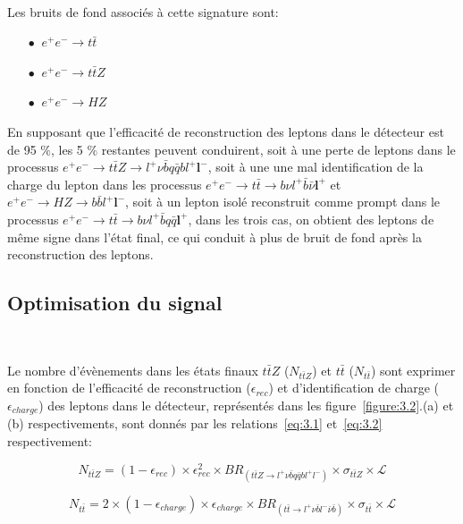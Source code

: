~\par Les bruits de fond associés \`a cette signature sont:
\begin{itemize}
\item[$\bullet$] $\ e^+e^-{\rightarrow}t\bar{t}$
\item[$\bullet$] $\ e^+e^-{\rightarrow}t\bar{t}Z$
\item[$\bullet$] $\ e^+e^-{\rightarrow}HZ$   
\end{itemize}
En supposant que l'efficacit\'e de reconstruction des leptons dans le d\'etecteur est de 95 $\%$, les 5 $\%$ restantes peuvent conduirent, soit \`a une perte de leptons dans le processus $e^+e^-{\rightarrow}t\bar{t}Z{\rightarrow}l^+\nu \bar{b}q\bar{q}bl^{+} \mathbf{l^-}$, soit \`a une une mal identification de la charge du lepton dans les processus $e^+e^-{\rightarrow}t\bar{t}{\rightarrow}b\nu l^+ \bar{b}\bar{\nu} \mathbf{l^+}$ et $e^+e^-{\rightarrow}HZ{\rightarrow}b\bar{b}l^+ \mathbf{l^-}$, soit à un lepton isolé reconstruit comme prompt dans le processus $e^+e^-{\rightarrow}t\bar{t}{\rightarrow}b\nu l^+\bar{b}q\bar{q} \mathbf{l^+}$, dans les trois cas, on obtient des leptons de m\^eme signe dans l'\'etat final, ce qui conduit \`a plus de bruit de fond apr\`es la reconstruction des leptons.

\subsection{Optimisation du signal}

~\par Le nombre d'\'ev\`enements dans les \'etats finaux $t\bar{t}Z$ ($N_{t\bar{t}Z}$) et $t\bar{t}$ ($N_{t\bar{t}}$) sont exprimer en fonction de l'efficacit\'e de reconstruction ($\epsilon_{rec}$) et d'identification de charge ($\epsilon_{charge}$) des leptons dans le d\'etecteur, repr\'esent\'es dans les figure~\ref{figure:3.2}.(a) et (b) respectivements, sont donn\'es par les relations~\eqref{eq:3.1} et~\eqref{eq:3.2} respectivement: 

\begin{equation}
  \label{eq:3.1}
  N_{t\bar{t}Z}=(1-\epsilon_{rec}){\times}\epsilon_{rec}^2{\times}BR_{(t\bar{t}Z{\rightarrow}l^+{\nu}\bar{b}q\bar{q}bl^+l^-)}{\times}\sigma_{t\bar{t}Z}{\times}\mathcal{L}  
\end{equation}

\begin{equation}
  \label{eq:3.2}
  N_{t\bar{t}}=2{\times}(1-\epsilon_{charge}){\times}\epsilon_{charge}{\times}BR_{(t\bar{t}{\rightarrow}l^+{\nu}\bar{b}l^-\bar{\nu}\bar{b})}{\times}\sigma_{t\bar{t}}{\times}\mathcal{L}  
\end{equation}

